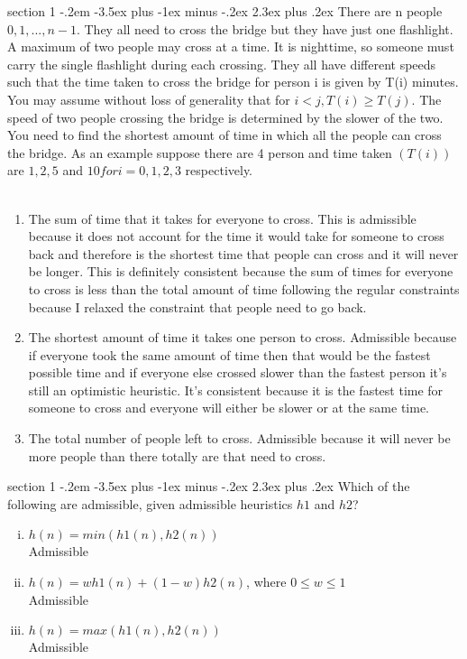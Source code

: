 \documentclass[12pt]{article}
\makeatletter
\newenvironment{problem}{\@startsection
  {section}
  {1}
  {-.2em}
  {-3.5ex plus -1ex minus -.2ex}
  {2.3ex plus .2ex}
  {
    \large\bf\noindent{Problem }
  }
}
\makeatother
\begin{document}
\begin{problem}{}
	\color{gray}
There are n people $0,1,...,n-1$. They all need to cross the bridge but they have just one ﬂashlight.
A maximum of two people may cross at a time. It is nighttime, so someone must carry the single
ﬂashlight during each crossing. They all have different speeds such that the time taken to cross the
bridge for person i is given by T(i) minutes. You may assume without loss of generality that for
$i < j, T(i) ≥ T(j)$. The speed of two people crossing the bridge is determined by the slower of the
two. You need to ﬁnd the shortest amount of time in which all the people can cross the bridge.
As an example suppose there are 4 person and time taken $(T(i))$ are $1,2,5$ and $10 for i = 0, 1, 2, 3$
respectively. \\ \\
	\color{black}
\begin{enumerate}
 \item The sum of time that it takes for everyone to cross.  This is
   admissible because it does not account for the time it would take
   for someone to cross back and therefore is the shortest time that
   people can cross and it will never be longer.  This is definitely
   consistent because the sum of times for everyone to cross is less
   than the total amount of time following the regular constraints
   because I relaxed the constraint that people need to go back.\\
  \item The shortest amount of time it takes one person to cross.
    Admissible because if everyone took the same amount of time then
    that would be the fastest possible time and if everyone else
    crossed slower than the fastest person it's still an optimistic
    heuristic.  It's consistent because it is the fastest time for
    someone to cross and everyone will either be slower or at the same
    time.\\
\item The total number of people left to cross.  Admissible because it
  will never be more people than there totally are that need to cross.\\
\end{enumerate}
	
\end{problem}

\begin{problem}{}
	\color{gray}
Which of the following are admissible, given admissible heuristics $h1$ and $h2$?
	\color{black}
	\begin{enumerate}[i.]
		\item $h(n) = min(h1(n), h2(n))$ \\
                  Admissible 

		\item  $h(n) = w h1(n) + (1 − w)h2(n)$, where $0 \leq w \leq 1$\\
                  Admissible

		\item $h(n) = max(h1(n), h2(n))$\\
                  Admissible
	\end{enumerate}
\end{problem}
\end{document}
